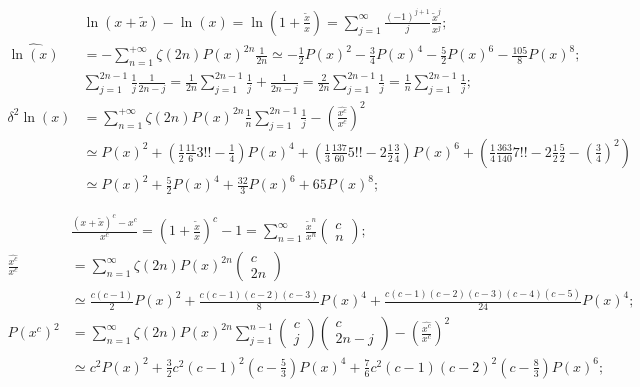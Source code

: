 \documentclass[twoside]{article}
\numberwithin{equation}{section}
\begin{document}
\begin{align*}
& \ln(x + \tilde{x}) - \ln(x) = \ln(1 + \frac{\tilde{x}}{x}) = \sum_{j=1}^{\infty} \frac{(-1)^{j+1}}{j} \frac{\tilde{x}^j}{x^j}; \\
\widehat{\ln(x)} &= -\sum_{n=1}^{+\infty} \zeta(2n) P(x)^{2n} \frac{1}{2n} 
 \simeq - \frac{1}{2} P(x)^2 - \frac{3}{4} P(x)^4 - \frac{5}{2} P(x)^6 - \frac{105}{8} P(x)^8; \\
&\sum_{j=1}^{2n-1} \frac{1}{j} \frac{1}{2n - j} = \frac{1}{2n} \sum_{j=1}^{2n-1} \frac{1}{j} +  \frac{1}{2n - j} = \frac{2}{2n} \sum_{j=1}^{2n-1} \frac{1}{j}
 = \frac{1}{n} \sum_{j=1}^{2n-1} \frac{1}{j}; \\
\delta^2 \ln(x) &= \sum_{n=1}^{+\infty} \zeta(2n) P(x)^{2n} \frac{1}{n} \sum_{j=1}^{2n-1} \frac{1}{j} - \left(\frac{\widehat{x^c}}{x^c}\right)^2 \\
 &\simeq P(x)^2 + (\frac{1}{2} \frac{11}{6} 3!! - \frac{1}{4}) P(x)^4 
  + (\frac{1}{3} \frac{137}{60} 5!! - 2 \frac{1}{2} \frac{3}{4}) P(x)^6
  + (\frac{1}{4} \frac{363}{140} 7!!- 2 \frac{1}{2} \frac{5}{2} - (\frac{3}{4})^2 ) \\
 &\simeq P(x)^2 + \frac{5}{2} P(x)^4 + \frac{32}{3} P(x)^6 + 65 P(x)^8;
\end{align*}

\begin{align*}
&\frac{(x + \tilde{x})^c - x^c}{x^c} = (1 + \frac{\tilde{x}}{x})^c - 1 = \sum_{n=1}^{\infty} \frac{\tilde{x}^n}{x^n} \begin{pmatrix} c \\ n \end{pmatrix}; \\
\frac{\widehat{x^c}}{x^c} &= \sum_{n=1}^{\infty} \zeta(2n) P(x)^{2n} \begin{pmatrix} c \\ 2n \end{pmatrix} \\
 &\simeq \frac{c(c-1)}{2} P(x)^2 + \frac{c(c-1)(c-2)(c-3)}{8} P(x)^4 + \frac{c(c-1)(c-2)(c-3)(c-4)(c-5)}{24} P(x)^4; \\
P(x^c)^2 &= \sum_{n=1}^{\infty} \zeta(2n) P(x)^{2n} \sum_{j=1}^{n-1} \begin{pmatrix} c \\ j \end{pmatrix} \begin{pmatrix} c \\ 2n - j \end{pmatrix}
 - \left(\frac{\widehat{x^c}}{x^c}\right)^2 \\
 &\simeq c^2 P(x)^2 + \frac{3}{2} c^2 (c-1)^2 (c - \frac{5}{3}) P(x)^4 + \frac{7}{6} c^2 (c-1) (c-2)^2 (c - \frac{8}{3}) P(x)^6;
\end{align*}
\end{document}
